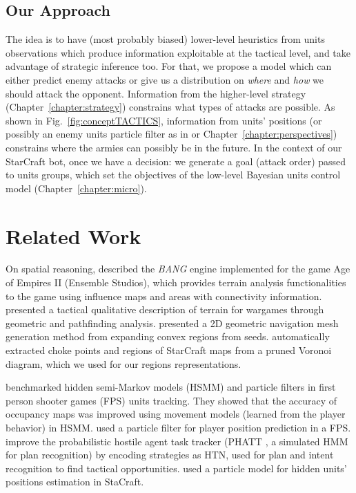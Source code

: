 \subsection{Our Approach}
The idea is to have (most probably biased) lower-level heuristics from units observations which produce information exploitable at the tactical level, and take advantage of strategic inference too. 
For that, we propose a model which can either predict enemy attacks or give us a distribution on \textit{where} and \textit{how} we should attack the opponent. Information from the higher-level strategy \citep{SYNNAEVE:StratPred,SYNNAEVE:OpeningPred} (Chapter~\ref{chapter:strategy}) constrains what types of attacks are possible. As shown in Fig.~\ref{fig:conceptTACTICS}, information from units' positions (or possibly an enemy units particle filter as in \citep{weber2011aiide} or Chapter~\ref{chapter:perspectives}) constrains where the armies can possibly be in the future. In the context of our StarCraft bot, once we have a decision: we generate a goal (attack order) passed to units groups, which set the objectives of the low-level Bayesian units control model \citep{SYNNAEVE:Micro} (Chapter~\ref{chapter:micro}).


\section{Related Work}

On spatial reasoning, \cite{Pottinger00} described the \textit{BANG} engine implemented for the game Age of Empires II (Ensemble Studios), which provides terrain analysis functionalities to the game using influence maps and areas with connectivity information. 
\cite{Forbus2002} presented a tactical qualitative description of terrain for wargames through geometric and pathfinding analysis. \cite{Hale08} presented a 2D geometric navigation mesh generation method from expanding convex regions from seeds. \cite{Perkins2010} automatically extracted choke points and regions of StarCraft maps from a pruned Voronoi diagram, which we used for our regions representations. 

\cite{Hladky_anevaluation} benchmarked hidden semi-Markov models (HSMM) and particle filters in first person shooter games (FPS) units tracking. They showed that the accuracy of occupancy maps was improved using movement models (learned from the player behavior) in HSMM. \cite{particlefiltergameAI} used a particle filter for player position prediction in a FPS. \cite{Kabanza2010} improve the probabilistic hostile agent task tracker (PHATT \citep{PHATT}, a simulated HMM for plan recognition) by encoding strategies as HTN, used for plan and intent recognition to find tactical opportunities. \cite{weber2011aiide} used a particle model for hidden units' positions estimation in StaCraft.

